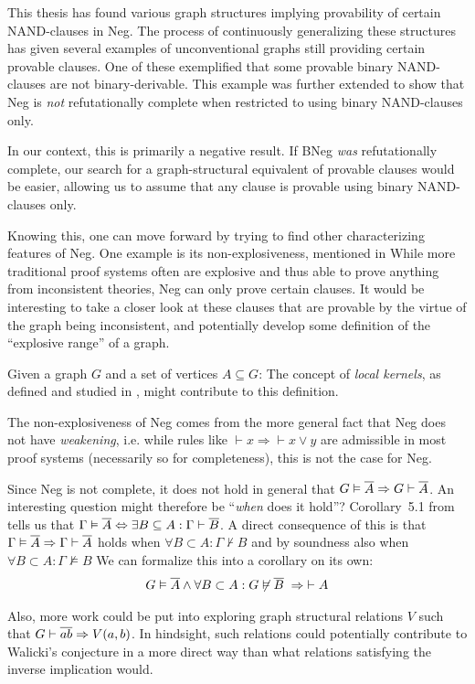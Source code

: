 This thesis has found various graph structures implying provability of certain NAND-clauses in Neg.
The process of continuously generalizing these structures has given several examples of unconventional graphs still providing certain provable clauses.
One of these exemplified that some provable binary NAND-clauses are not binary-derivable.
This example was further extended to show that Neg is \textit{not} refutationally complete when restricted to using binary NAND-clauses only.

In our context, this is primarily a negative result.
If BNeg \textit{was} refutationally complete, our search for a graph-structural equivalent of provable clauses would be easier, allowing us to assume that any clause is provable using binary NAND-clauses only.

Knowing this, one can move forward by trying to find other characterizing features of Neg.
One example is its non-explosiveness, mentioned in \cite{michal-completeness}
While more traditional proof systems often are explosive and thus able to prove anything from inconsistent theories, Neg can only prove certain clauses.
It would be interesting to take a closer look at these clauses that are provable by the virtue of the graph being inconsistent, and potentially develop some definition of the ``explosive range'' of a graph.
\begin{conjecture}
  Given a graph $G$ and a set of vertices $A \subseteq G$:
The concept of \textit{local kernels}, as defined and studied in \cite{synthese-pdl}, might contribute to this definition.

The non-explosiveness of Neg comes from the more general fact that Neg does not have \textit{weakening}, i.e. while rules like $\vdash x \Rightarrow \vdash x \vee y$ are admissible in most proof systems (necessarily so for completeness), this is not the case for Neg.

Since Neg is not complete, it does not hold in general that $G \vDash \ol{A} \Rightarrow G \vdash \ol{A}$.
An interesting question might therefore be ``\textit{when} does it hold''?
Corollary~5.1 from \cite{michal-completeness} tells us that $\Gamma \vDash \ol{A} \Leftrightarrow \exists B \subseteq A: \Gamma \vdash \ol{B}$.
A direct consequence of this is that $\Gamma \vDash \ol{A} \Rightarrow \Gamma \vdash \ol{A}$ holds when $\forall B \subset A: \Gamma \not\vdash B$ and by soundness also when $\forall B \subset A: \Gamma \not\vDash B$
We can formalize this into a corollary on its own:
  \begin{align}
    G \vDash \ol{A} \wedge \forall B \subset A: G \not\vDash \ol{ B } \;\Rightarrow \; \vdash A
  \end{align}
\end{conjecture}

Also, more work could be put into exploring graph structural relations $V$ such that $G \vdash \ol{ab} \Rightarrow V(a,b)$.
In hindsight, such relations could potentially contribute to Walicki's conjecture in a more direct way than what relations satisfying the inverse implication would.
